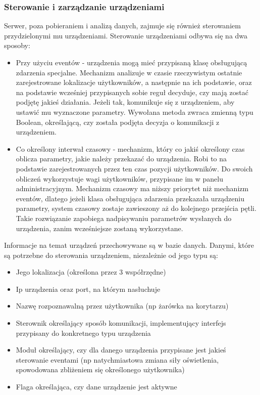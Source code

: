 \documentclass{article}
\begin{document}
		\subsubsection{Sterowanie i zarządzanie urządzeniami}
		Serwer, poza pobieraniem i analizą danych, zajmuje się również sterowaniem przydzielonymi mu urządzeniami. Sterowanie urządzeniami odbywa się na dwa sposoby:
		\begin{itemize}
			\item Przy użyciu eventów - urządzenia mogą mieć przypisaną klasę obsługującą zdarzenia specjalne. Mechanizm analizuje w czasie rzeczywistym ostatnie zarejestrowane lokalizacje użytkowników, a następnie na ich podstawie, oraz na podstawie wcześniej przypisanych sobie reguł decyduje, czy mają zostać podjętę jakieś działania. Jeżeli tak, komunikuje się z urządzeniem, aby ustawić mu wyznaczone parametry. Wywołana metoda zwraca zmienną typu Boolean, określającą, czy została podjęta decyzja o komunikacji z urządzeniem.
			\item Co określony interwał czasowy - mechanizm, który co jakiś określony czas oblicza parametry, jakie należy przekazać do urządzenia. Robi to na podstawie zarejestrowanych przez ten czas pozycji użytkowników. Do swoich obliczeń wykorzystuje wagi użytkowników, przypisane im w panelu administracyjnym. Mechanizm czasowy ma niższy priorytet niż mechanizm eventów, dlatego jeżeli klasa obsługująca zdarzenia przekazała urządzeniu parametry, system czasowy zostaje zawieszony aż do kolejnego przejścia pętli. Takie rozwiązanie zapobiega nadpisywaniu parametrów wysłanych do urządzenia, zanim wcześniejsze zostaną wykorzystane.
		\end{itemize}
		Informacje na temat urządzeń przechowywane są w bazie danych. Danymi, które są potrzebne do sterowania urządzeniem, niezależnie od jego typu są:
		\begin{itemize}
			\item Jego lokalizacja (określona przez 3 współrzędne)
			\item Ip urządzenia oraz port, na którym nasłuchuje
			\item Nazwę rozpoznawalną przez użytkownika (np żarówka na korytarzu)
			\item Sterownik określający sposób komunikacji, implementujący interfejs przypisany do konkretnego typu urządzenia
			\item Moduł określający, czy dla danego urządzenia przypisane jest jakieś sterowanie eventami (np natychmiastowa zmiana siły oświetlenia, spowodowana zbliżeniem się określonego użytkownika)
			\item Flaga określająca, czy dane urządzenie jest aktywne
		\end{itemize}
\end{document}
